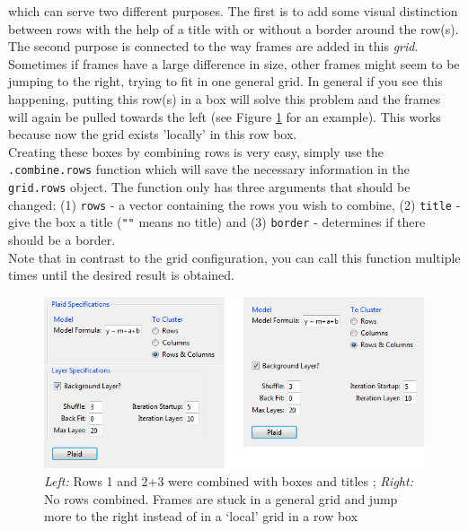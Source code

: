 \documentclass[a4paper]{article}\usepackage[]{graphicx}\usepackage[]{color}
\begin{document}
which can serve two different purposes. The first is 	to add some visual
distinction between rows with the help of a title with or without a border around the row(s).\\
The second purpose is connected to the way frames are added in this {\it grid}.
Sometimes if frames have a large difference in size, other frames might seem to
be jumping to the right, trying to fit in one general grid. In general if you
see this happening, putting this row(s) in a box will solve this problem and the
frames will again be pulled towards the left (see Figure \ref{combinerows_grid}
for an example). This works because now the grid exists 'locally' in this row
box.\\
Creating these boxes by combining rows is very easy, simply use the
\verb|.combine.rows| function which will save the necessary information in the
\verb|grid.rows| object. The function only has three arguments that should be
changed: (1) \verb|rows| - a vector containing the rows you wish to combine,
 (2) \verb|title| - give the box a title (\verb|""| means no title) and
(3) \verb|border| - determines if there should be a border.\\
Note that in contrast to the grid configuration, you can call this function
multiple times until the desired result is obtained.

\begin{figure}[H]
\centering
\includegraphics[scale=0.4]{figures/combinerows_grid.png}
\caption{{\it Left:} Rows 1 and 2+3 were combined with boxes and titles ; {\it
Right:} No rows combined. Frames are stuck in a general grid and jump more to
the right instead of in a `local' grid in a row box \label{combinerows_grid}}
\end{figure}
\end{document}
